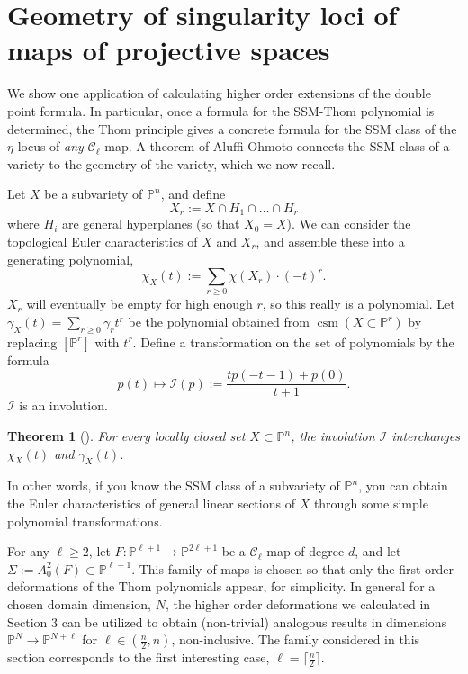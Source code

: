 \documentclass[11pt]{article}
\theoremstyle{plain}
\newtheorem{theorem}[fact]{Theorem}
\theoremstyle{definition}
\theoremstyle{definition}
\newcommand{\bb}[1]{\mathbb{#1}}
\DeclareMathOperator{\csm}{csm}
\begin{document}
\section{Geometry of singularity loci of maps of projective spaces}

We show one application of calculating higher order extensions of the double point formula. In particular, once a formula for the SSM-Thom polynomial is determined, the Thom principle gives a concrete formula for the SSM class of the $\eta$-locus of \textit{any} $\mathcal C_\ell$-map. A theorem of Aluffi-Ohmoto connects the SSM class of a variety to the geometry of the variety, which we now recall. 

Let $X$ be a subvariety of $\bb P^n$, and define 
\[
X_r:=X \cap H_1\cap \dots \cap H_r
\]
where $H_i$ are general hyperplanes (so that $X_0=X$). We can consider the topological Euler characteristics of $X$ and $X_r$, and assemble these into a generating polynomial,
\[
\chi_X(t):=\sum_{r\geq 0}\chi(X_r)\cdot (-t)^r.
\]
$X_r$ will eventually be empty for high enough $r$, so this really is a polynomial. Let $\gamma_X(t) = \sum_{r\geq 0}\gamma_r t^r$ be the polynomial obtained from $\csm(X\subset \bb P^r)$ by replacing $[\bb P^r]$ with $t^r$. Define a transformation on the set of polynomials by the formula
\[
p(t)\mapsto \mathscr I(p):=\frac{tp(-t-1)+p(0)}{t+1}.
\]
$\mathscr I$ is an involution. 
\begin{theorem}[\cite{aluffi}\cite{ohm-integral}]\label{linear sections}
For every locally closed set $X\subset \mathbb P^n$, the involution $\mathscr I$ interchanges $\chi_X(t)$ and $\gamma_X(t)$. 
\end{theorem}

In other words, if you know the SSM class of a subvariety of $\mathbb P^n$, you can obtain the Euler characteristics of general linear sections of $X$ through some simple polynomial transformations. 

For any $\ell\geq 2$, let $F: \mathbb P^{\ell+1}\to \mathbb P^{2\ell+1}$ be a $\mathcal C_\ell$-map of degree $d$, and let $\Sigma :=A_0^2(F)\subset \mathbb{P}^{\ell+1}$. This family of maps is chosen so that only the first order deformations of the Thom polynomials appear, for simplicity. In general for a chosen domain dimension, $N$, the higher order deformations we calculated in Section 3 can be utilized to obtain (non-trivial) analogous results in dimensions $\bb P^N\to \bb P^{N+\ell}$ for $\ell \in \left(\frac n2,n\right)$, non-inclusive. The family considered in this section corresponds to the first interesting case, $\ell=\lceil\frac n2\rceil$.
\end{document}
